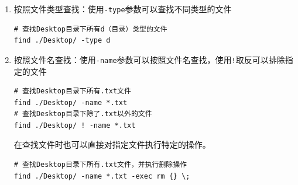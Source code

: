 \documentclass[12pt, openany, oneside]{book}
\begin{document}
\begin{enumerate}
    \item 按照文件类型查找：使用\lstinline|-type|参数可以查找不同类型的文件
          \vspace{-0.5cm}
          \begin{lstlisting}
# 查找Desktop目录下所有d（目录）类型的文件
find ./Desktop/ -type d
\end{lstlisting}

          \begin{table}[H]
              \centering
              \caption{文件类型}
          \end{table}

    \item 按照文件名查找：使用\lstinline|-name|参数可以按照文件名查找，使用\lstinline|!|取反可以排除指定的文件
          \vspace{-0.5cm}
          \begin{lstlisting}
# 查找Desktop目录下所有.txt文件
find ./Desktop/ -name *.txt
# 查找Desktop目录下除了.txt以外的文件
find ./Desktop/ ! -name *.txt
            \end{lstlisting}

          在查找文件时也可以直接对指定文件执行特定的操作。
          \vspace{-0.5cm}
          \begin{lstlisting}
# 查找Desktop目录下所有.txt文件，并执行删除操作
find ./Desktop/ -name *.txt -exec rm {} \;
            \end{lstlisting}
\end{enumerate}
\end{document}
